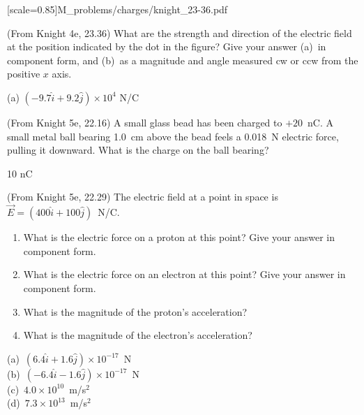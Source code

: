 [scale=0.85]{M_problems/charges/knight_23-36.pdf}{
\begin{Exercise}
(From Knight 4e, 23.36) What are the strength and direction of the electric field at the position indicated by the dot in the figure?  Give your answer (a)~in component form, and (b)~as a magnitude and angle measured cw or ccw from the positive $x$ axis.
\end{Exercise}
\begin{Answer}
(a) $(-9.7\hat{i}+9.2\hat{j}) \times 10^4$  N/C
\end{Answer}


\begin{Exercise}
(From Knight 5e, 22.16) A small glass bead has been charged to $+20$~nC.  A small metal ball bearing 1.0~cm above the bead feels a 0.018~N electric force, pulling it downward.  What is the charge on the ball bearing?
\end{Exercise}
\begin{Answer}
10 nC
\end{Answer}
}
\begin{Exercise}
(From Knight 5e, 22.29) The electric field at a point in space is $\vec{E}=(400\hat{i}+100\hat{j})$~N/C. 
\begin{enumerate}[labparts, nosep, topsep=-2ex, after={\vspace{2ex}}]
\item What is the electric force on a proton at this point? Give your answer in component form.
\item What is the electric force on an electron at this point? Give your answer in component form.
\item What is the magnitude of the proton's acceleration?
\item What is the magnitude of the electron's acceleration?
\end{enumerate}
\end{Exercise}
\begin{Answer}
(a)~$(6.4\hat{i}+1.6\hat{j})\times 10^{-17}$~N \\
(b)~$(-6.4\hat{i}-1.6\hat{j})\times 10^{-17}$~N \\
(c)~$4.0\times10^{10}$~m/s$^2$ \\
(d)~$7.3\times10^{13}$~m/s$^2$
\end{Answer}

